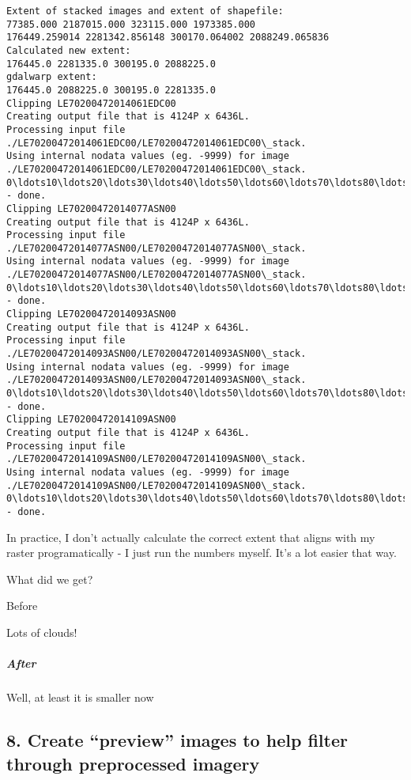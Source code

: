 \documentclass{article}
\begin{document}
    \begin{Verbatim}[commandchars=\\\{\}]
Extent of stacked images and extent of shapefile:
77385.000 2187015.000 323115.000 1973385.000
176449.259014 2281342.856148 300170.064002 2088249.065836
Calculated new extent:
176445.0 2281335.0 300195.0 2088225.0
gdalwarp extent:
176445.0 2088225.0 300195.0 2281335.0
Clipping LE70200472014061EDC00
Creating output file that is 4124P x 6436L.
Processing input file ./LE70200472014061EDC00/LE70200472014061EDC00\_stack.
Using internal nodata values (eg. -9999) for image ./LE70200472014061EDC00/LE70200472014061EDC00\_stack.
0\ldots10\ldots20\ldots30\ldots40\ldots50\ldots60\ldots70\ldots80\ldots90\ldots100 - done.
Clipping LE70200472014077ASN00
Creating output file that is 4124P x 6436L.
Processing input file ./LE70200472014077ASN00/LE70200472014077ASN00\_stack.
Using internal nodata values (eg. -9999) for image ./LE70200472014077ASN00/LE70200472014077ASN00\_stack.
0\ldots10\ldots20\ldots30\ldots40\ldots50\ldots60\ldots70\ldots80\ldots90\ldots100 - done.
Clipping LE70200472014093ASN00
Creating output file that is 4124P x 6436L.
Processing input file ./LE70200472014093ASN00/LE70200472014093ASN00\_stack.
Using internal nodata values (eg. -9999) for image ./LE70200472014093ASN00/LE70200472014093ASN00\_stack.
0\ldots10\ldots20\ldots30\ldots40\ldots50\ldots60\ldots70\ldots80\ldots90\ldots100 - done.
Clipping LE70200472014109ASN00
Creating output file that is 4124P x 6436L.
Processing input file ./LE70200472014109ASN00/LE70200472014109ASN00\_stack.
Using internal nodata values (eg. -9999) for image ./LE70200472014109ASN00/LE70200472014109ASN00\_stack.
0\ldots10\ldots20\ldots30\ldots40\ldots50\ldots60\ldots70\ldots80\ldots90\ldots100 - done.
    \end{Verbatim}

    In practice, I don't actually calculate the correct extent that aligns
with my raster programatically - I just run the numbers myself. It's a
lot easier that way.

What did we get?

Before

Lots of clouds!

\subparagraph{After}

Well, at least it is smaller now

    \subsection{8. Create ``preview'' images to help filter through
preprocessed imagery}
\end{document}
